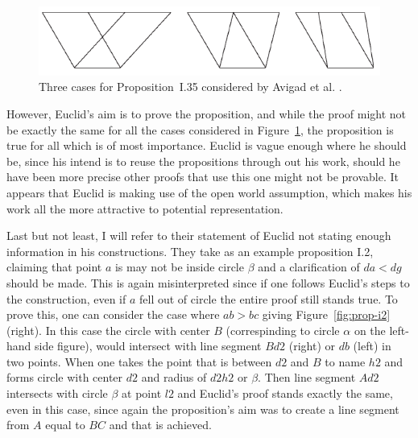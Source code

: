 \documentclass[]{interact}
\theoremstyle{plain}
\theoremstyle{definition}
\theoremstyle{remark}
\begin{document}
\begin{figure}[h]
  \centering
  \includegraphics[scale=0.7]{avigad-fig9-I35}
  \caption[Avigad et al Approach I.35]{Three cases for
    Proposition~I.35 considered by Avigad et al. \cite{avigad-etal:2009}.}
  \label{fig:avigadi35}
\end{figure}

However, Euclid's aim is to prove the proposition, and while the proof
might not be exactly the same for all the cases considered in
Figure~\ref{fig:avigadi35}, the proposition is true for all which is
of most importance. Euclid is vague enough where he should be, since
his intend is to reuse the propositions through out his work, should
he have been more precise other proofs that use this one might not be
provable. It appears that Euclid is making use of the open world
assumption, which makes his work all the more attractive to potential
representation.

Last but not least, I will refer to their statement of Euclid not
stating enough information in his constructions. They take as an
example proposition I.2, claiming that point $a$ is may not be inside
circle $\beta$ and a clarification of $da<dg$ should be made. This is
again misinterpreted since if one follows Euclid's steps to the
construction, even if $a$ fell out of circle the entire proof still
stands true. To prove this, one can consider the case where $ab>bc$
giving Figure~\ref{fig:prop-i2} (right). In this case the
circle with center $B$ (correspinding to circle $\alpha$ on the
left-hand side figure), would intersect with line
segment $Bd2$ (right) or $db$ (left) in two points.
When one takes the point that is between $d2$ and $B$ to name $h2$ and
forms circle with center $d2$ and radius of $d2h2$ or $\beta$. Then
line segment $Ad2$ intersects with circle $\beta$ at point $l2$ and
Euclid's proof stands exactly the same, even in this case, since again
the proposition's aim was to create a line segment from $A$ equal to
$BC$ and that is achieved.
\end{document}
